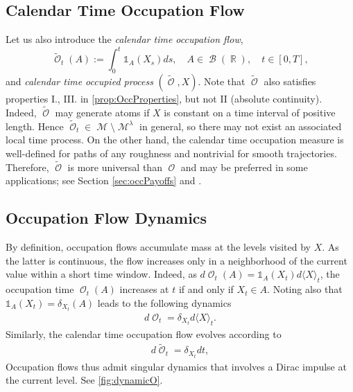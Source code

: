 \documentclass[11pt]{article}
\theoremstyle{plain}
\theoremstyle{definition}
\DeclareMathOperator{\R}{\mathbb{R}}
\DeclareMathOperator{\calB}{\mathcal{B}}
\DeclareMathOperator{\calM}{\mathcal{M}}
\DeclareMathOperator{\calO}{\mathcal{O}}
\begin{document}
\subsection{Calendar Time Occupation Flow}\label{sec:calendarTimeOcc}
Let us  also introduce the \textit{calendar time occupation flow}, 
\begin{equation}\label{eq:stdTimeoccupation}
    \tilde{\calO}_t(A) :=\int_0^t\mathds{1}_A(X_s
)ds, \quad A \in \calB(\R), \quad t\in [0,T], 
     \end{equation}  
     and \textit{calendar time occupied process} $(\tilde{\calO},X)$. 
     Note that $\tilde{\calO}$ also satisfies properties I., III. in \cref{prop:OccProperties}, but not II (absolute continuity). Indeed, $\tilde{\calO}$ may generate atoms if $X$ is constant on a time interval of positive length. 
     Hence $\tilde{\calO}_t \in \calM \setminus \calM^{\lambda}$ in general, so there may not exist an associated local time process.  
     On the other hand, 
     the calendar time occupation measure is well-defined  for paths of any roughness 
     and nontrivial for 
     smooth trajectories. 
Therefore, $\tilde{\calO}$ is more universal than $\calO$ and may be  preferred in some applications;  see Section  \ref{sec:occPayoffs} and \cite{TissotLOV}.  

\subsection{Occupation Flow Dynamics}\label{sec:occFlowDynamics}


By definition, occupation flows accumulate mass at the levels visited by  $X$. As the latter is  continuous, the flow increases only in a neighborhood of the current value  within a short  time window. 
Indeed, as  $d\calO_t(A) = \mathds{1}_{A}(X_t)d\langle X \rangle_t$,  the occupation time $\calO_t(A)$ increases at $t$ if and only if $X_t\in A$. Noting also that $\mathds{1}_{A}(X_t) = \delta_{X_t}(A)$ leads to  the following dynamics 
\begin{align}
   d\calO_t = \delta_{X_t}d\langle X \rangle_t. \label{eq:flowDynamics} 
\end{align} 
Similarly,  the calendar time occupation flow  evolves according to   
\begin{align}
  d\tilde{\calO}_t = \delta_{X_t}dt, \label{eq:flowDynamicsStd} 
\end{align}
Occupation flows thus admit singular dynamics  that involves a Dirac impulse at the current level. 
See \cref{fig:dynamicO}. 
\end{document}

